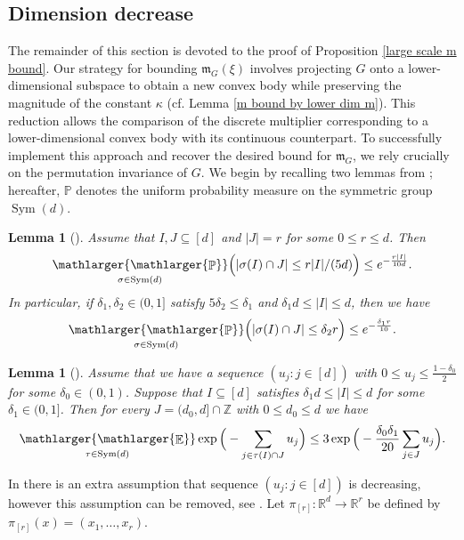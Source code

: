 \documentclass[a4paper,oneside, reqno]{amsart}
\numberwithin{equation}{section}
\newtheorem{Lem}[Thm]{Lemma}
\theoremstyle{definition}%
\theoremstyle{definition}
\theoremstyle{definition}%
\theoremstyle{definition}
\newcommand{\E}{\mathop{\mathbb{E}}}
\newcommand{\Pro}{\mathop{\mathbb{P}}}
\newcommand{\Z}{\mathbb{Z}}
\newcommand{\R}{\mathbb{R}}
\DeclareMathOperator{\Sym}{Sym}
\newcommand{\se}[1]{\underset{_{\substack{#1}}}{\mathlarger{\mathlarger{\E}}}}
\newcommand{\spr}[1]{\underset{_{\substack{#1}}}{\mathlarger{\mathlarger{\Pro}}}}
\begin{document}
\subsection{Dimension decrease} 
The remainder of this section is devoted to the proof of Proposition \ref{large scale m bound}. Our strategy for bounding $\mathfrak{m}_G(\xi)$ involves projecting $G$ onto a lower-dimensional subspace to obtain a new convex body while preserving the magnitude of the constant $\kappa$ (cf. Lemma \ref{m bound by lower dim m}). This reduction allows the comparison of the discrete multiplier corresponding to a lower-dimensional convex body with its continuous counterpart. To successfully implement this approach and recover the desired bound for $\mathfrak{m}_G$, we rely crucially on the permutation invariance of $G$. We begin by recalling two lemmas from \cite{balls}; hereafter, $\mathbb{P}$ denotes the uniform probability measure on the symmetric group $\Sym(d)$.
\begin{Lem}[{\cite[Lemma 2.5]{balls}}] \label{sym inter bound}
Assume that  $I, J\subseteq [d]$ and 
$|J|=r$ for some $0\le r\le d$. Then
\begin{align*}
\spr{\sigma \in \Sym(d)}\Big(|\sigma(I)\cap J|\le {r|I|}/{(5d)}\Big) \le  e^{-\frac{r|I|}{10d}}.
\end{align*}
 In particular, if $\delta_1, \delta_2\in(0, 1]$ satisfy
$5\delta_2\le\delta_1$ and $\delta_1d\le |I|\le d$, then we have
\begin{align*}
\spr{\sigma \in \Sym(d)}\Big( |\sigma(I)\cap
  J|\le \delta_2 r\Big) \le e^{-\frac{\delta_1r}{10}}.
\end{align*}  
\end{Lem}
\begin{Lem}[{\cite[Lemma 2.6]{balls}}]
\label{lem:2.6} Assume that we have a sequence $(u_j: j \in [d])$ with $0 \leq u_j \leq \frac{1- \delta_0}{2}$ for some $\delta_0 \in (0,1)$. Suppose that $I \subseteq [d]$ satisfies $\delta_1d \leq |I| \leq d$ for some $ \delta_1 \in (0,1]$. Then for every $J=(d_0,d] \cap \Z$ with $0 \leq d_0 \leq d$ we have
\[
\se{\tau \in \Sym(d)} \exp\Big(- \sum_{j \in \tau(I) \cap J} u_j\Big) \leq 3 \exp\Big(-\frac{\delta_0 \delta_1}{20} \sum_{j \in J} u_j \Big).
\]
\end{Lem}
\noindent In \cite[Lemma 2.6]{balls} there is an extra assumption that sequence $(u_j: j \in [d])$ is decreasing, however this assumption can be removed, see \cite[Lemma 6.7]{MiSzWr}.
Let $\pi_{[r]}: \R^d \to \R^r$ be defined by $\pi_{[r]}(x)=(x_1,\ldots,x_r)$.
\end{document}
